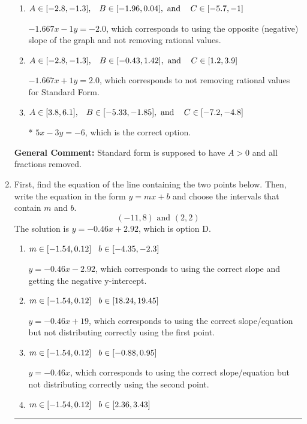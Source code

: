 \documentclass{extbook}[14pt]
\newcommand{\litem}[1]{\item #1

\rule{\textwidth}{0.4pt}}
\begin{document}
\begin{enumerate}
{\begin{enumerate}[label=\Alph*.]
 $-5x + 3y = 6$, which corresponds to not making $A$ positive (by multiplying the equation by $-1$).
\item \( A \in [-2.8, -1.3], \hspace{3mm} B \in [-1.96, 0.04], \text{ and } \hspace{3mm} C \in [-5.7, -1] \)

 $-1.667x - 1y = -2.0$, which corresponds to using the opposite (negative) slope of the graph and not removing rational values.
\item \( A \in [-2.8, -1.3], \hspace{3mm} B \in [-0.43, 1.42], \text{ and } \hspace{3mm} C \in [1.2, 3.9] \)

 $-1.667x + 1y = 2.0$, which corresponds to not removing rational values for Standard Form.
\item \( A \in [3.8, 6.1], \hspace{3mm} B \in [-5.33, -1.85], \text{ and } \hspace{3mm} C \in [-7.2, -4.8] \)

* $5x - 3y = -6$, which is the correct option.
\end{enumerate}

\textbf{General Comment:} Standard form is supposed to have $A > 0$ and all fractions removed.
}
\litem{
First, find the equation of the line containing the two points below. Then, write the equation in the form $ y=mx+b $ and choose the intervals that contain $m$ and $b$.
\[ (-11, 8) \text{ and } (2, 2) \]The solution is \( y = -0.46x + 2.92 \), which is option D.\begin{enumerate}[label=\Alph*.]
\item \( m \in [-1.54, 0.12] \hspace*{3mm} b \in [-4.35, -2.3] \)

 $y = -0.46x -2.92$, which corresponds to using the correct slope and getting the negative y-intercept.
\item \( m \in [-1.54, 0.12] \hspace*{3mm} b \in [18.24, 19.45] \)

 $y = -0.46x + 19$, which corresponds to using the correct slope/equation but not distributing correctly using the first point.
\item \( m \in [-1.54, 0.12] \hspace*{3mm} b \in [-0.88, 0.95] \)

 $y = -0.46x$, which corresponds to using the correct slope/equation but not distributing correctly using the second point.
\item \( m \in [-1.54, 0.12] \hspace*{3mm} b \in [2.36, 3.43] \)


\end{enumerate}}
\end{enumerate}
\end{document}
